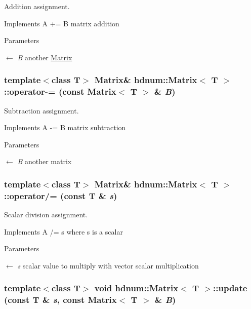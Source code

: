 Addition assignment. 

Implements A += B matrix addition


\begin{DoxyParams}{Parameters}
\item[\mbox{$\leftarrow$} {\em B}]another \hyperlink{classhdnum_1_1Matrix}{Matrix} \end{DoxyParams}
\hypertarget{classhdnum_1_1Matrix_acbc74183e387ce2bc40fa3d785e75a83}{
\subsubsection[{operator-\/=}]{\setlength{\rightskip}{0pt plus 5cm}template$<$class T$>$ {\bf Matrix}\& {\bf hdnum::Matrix}$<$ T $>$::operator-\/= (const {\bf Matrix}$<$ T $>$ \& {\em B})}}
\label{classhdnum_1_1Matrix_acbc74183e387ce2bc40fa3d785e75a83}


Subtraction assignment. 

Implements A -\/= B matrix subtraction


\begin{DoxyParams}{Parameters}
\item[\mbox{$\leftarrow$} {\em B}]another matrix \end{DoxyParams}
\hypertarget{classhdnum_1_1Matrix_ac4850f9b5df8da4a8fb40ddf05a3ed39}{
\subsubsection[{operator/=}]{\setlength{\rightskip}{0pt plus 5cm}template$<$class T$>$ {\bf Matrix}\& {\bf hdnum::Matrix}$<$ T $>$::operator/= (const T \& {\em s})}}
\label{classhdnum_1_1Matrix_ac4850f9b5df8da4a8fb40ddf05a3ed39}


Scalar division assignment. 

Implements A /= s where s is a scalar


\begin{DoxyParams}{Parameters}
\item[\mbox{$\leftarrow$} {\em s}]scalar value to multiply with vector scalar multiplication \end{DoxyParams}
\hypertarget{classhdnum_1_1Matrix_acb2eaf3fb83498d4c7b2de964c5e53de}{
\subsubsection[{update}]{\setlength{\rightskip}{0pt plus 5cm}template$<$class T$>$ void {\bf hdnum::Matrix}$<$ T $>$::update (const T \& {\em s}, \/  const {\bf Matrix}$<$ T $>$ \& {\em B})}}
\label{classhdnum_1_1Matrix_acb2eaf3fb83498d4c7b2de964c5e53de}


